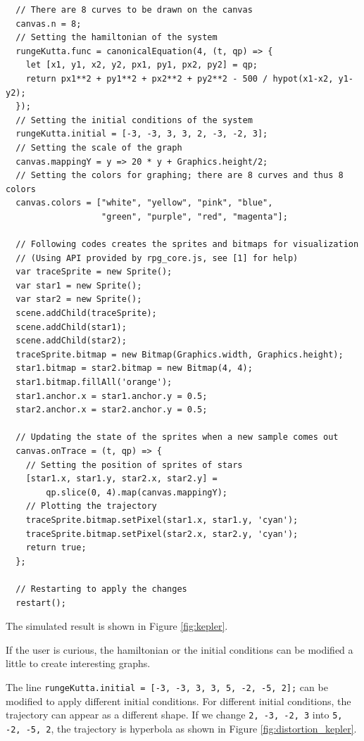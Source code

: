 \documentclass[12pt]{article}
\begin{document}
\begin{verbatim}
  // There are 8 curves to be drawn on the canvas
  canvas.n = 8;
  // Setting the hamiltonian of the system
  rungeKutta.func = canonicalEquation(4, (t, qp) => {
    let [x1, y1, x2, y2, px1, py1, px2, py2] = qp;
    return px1**2 + py1**2 + px2**2 + py2**2 - 500 / hypot(x1-x2, y1-y2);
  });
  // Setting the initial conditions of the system
  rungeKutta.initial = [-3, -3, 3, 3, 2, -3, -2, 3];
  // Setting the scale of the graph
  canvas.mappingY = y => 20 * y + Graphics.height/2;
  // Setting the colors for graphing; there are 8 curves and thus 8 colors
  canvas.colors = ["white", "yellow", "pink", "blue",
                   "green", "purple", "red", "magenta"];

  // Following codes creates the sprites and bitmaps for visualization
  // (Using API provided by rpg_core.js, see [1] for help)
  var traceSprite = new Sprite();
  var star1 = new Sprite();
  var star2 = new Sprite();
  scene.addChild(traceSprite);
  scene.addChild(star1);
  scene.addChild(star2);
  traceSprite.bitmap = new Bitmap(Graphics.width, Graphics.height);
  star1.bitmap = star2.bitmap = new Bitmap(4, 4);
  star1.bitmap.fillAll('orange');
  star1.anchor.x = star1.anchor.y = 0.5;
  star2.anchor.x = star2.anchor.y = 0.5;

  // Updating the state of the sprites when a new sample comes out
  canvas.onTrace = (t, qp) => {
    // Setting the position of sprites of stars
    [star1.x, star1.y, star2.x, star2.y] =
        qp.slice(0, 4).map(canvas.mappingY);
    // Plotting the trajectory
    traceSprite.bitmap.setPixel(star1.x, star1.y, 'cyan');
    traceSprite.bitmap.setPixel(star2.x, star2.y, 'cyan');
    return true;
  };

  // Restarting to apply the changes
  restart();
\end{verbatim}

The simulated result is shown in Figure \ref{fig:kepler}.

If the user is curious, the hamiltonian or the initial conditions can be modified a little to create interesting graphs.

The line \texttt{rungeKutta.initial = [-3, -3, 3, 3, 5, -2, -5, 2];}
can be modified to apply different initial conditions.
For different initial conditions, the trajectory can appear as a different shape.
If we change \texttt{2, -3, -2, 3} into \texttt{5, -2, -5, 2},
the trajectory is hyperbola as shown in Figure \ref{fig:distortion_kepler}.
\end{document}
